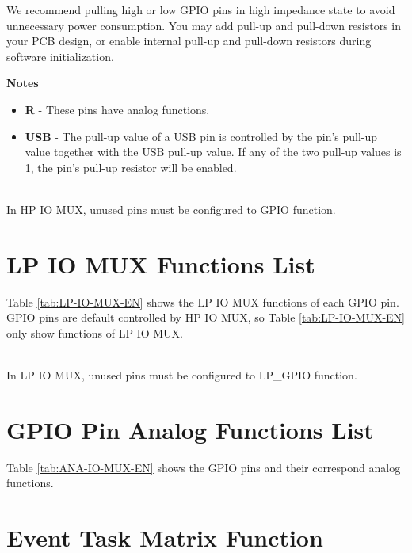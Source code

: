 \documentclass[main\_\_EN.tex]{subfiles}
\begin{document}
    We recommend pulling high or low GPIO pins in high impedance state to avoid unnecessary power consumption. You may add pull-up and pull-down resistors in your PCB design, or enable internal pull-up and pull-down resistors during software initialization.

    \textbf{Notes}

    \begin{itemize}
        \item \textbf{R} - These pins have analog functions.
        \item \textbf{USB} - The pull-up value of a USB pin is controlled by the pin's pull-up value together with the USB pull-up value. If any of the two pull-up values is 1, the pin's pull-up resistor will be enabled.
    \end{itemize}

\begin{importantlisting}\\
    In HP IO MUX, unused pins must be configured to GPIO function.
\end{importantlisting}

\section{LP IO MUX Functions List}
\label{sec:lp_iomux_pads}
Table \ref{tab:LP-IO-MUX-EN} shows the LP IO MUX functions of each GPIO pin. GPIO pins are default controlled by HP IO MUX, so Table \ref{tab:LP-IO-MUX-EN} only show functions of LP IO MUX.


\tableheaderLPFunctionsEN
\tablecontentLPFunctions

\begin{importantlisting}\\
    In LP IO MUX, unused pins must be configured to LP\_GPIO function.
\end{importantlisting}

\section{GPIO Pin Analog Functions List}
\label{sec:analog_pins}
Table \ref{tab:ANA-IO-MUX-EN} shows the GPIO pins and their correspond analog functions.


\tableheaderAnalogFunctionsEN
\tablecontentAnalogFunctions


\section{Event Task Matrix Function}
\end{document}
